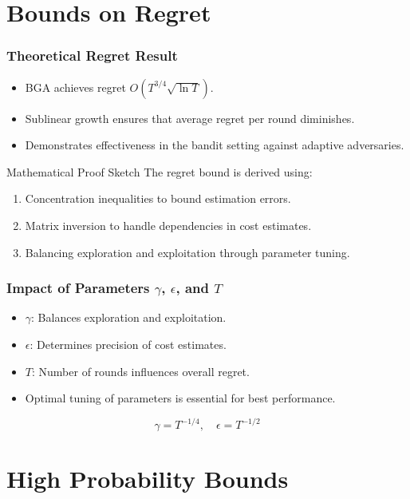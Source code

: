 \documentclass{beamer}
\begin{document}
\section{Bounds on Regret}

\begin{frame}
\frametitle{Theoretical Regret Result}
\begin{itemize}
    \item BGA achieves regret \( O\left(T^{3/4} \sqrt{\ln T}\right) \).
    \item Sublinear growth ensures that average regret per round diminishes.
    \item Demonstrates effectiveness in the bandit setting against adaptive adversaries.
\end{itemize}
\begin{block}{Mathematical Proof Sketch}
    The regret bound is derived using:
    \begin{enumerate}
        \item Concentration inequalities to bound estimation errors.
        \item Matrix inversion to handle dependencies in cost estimates.
        \item Balancing exploration and exploitation through parameter tuning.
    \end{enumerate}
\end{block}
\end{frame}

\begin{frame}
\frametitle{Impact of Parameters \( \gamma \), \( \epsilon \), and \( T \)}
\begin{itemize}
    \item \( \gamma \): Balances exploration and exploitation.
    \item \( \epsilon \): Determines precision of cost estimates.
    \item \( T \): Number of rounds influences overall regret.
    \item Optimal tuning of parameters is essential for best performance.
\end{itemize}
\begin{equation*}
    \gamma = T^{-1/4}, \quad \epsilon = T^{-1/2}
\end{equation*}
\end{frame}

\section{High Probability Bounds}
\end{document}
